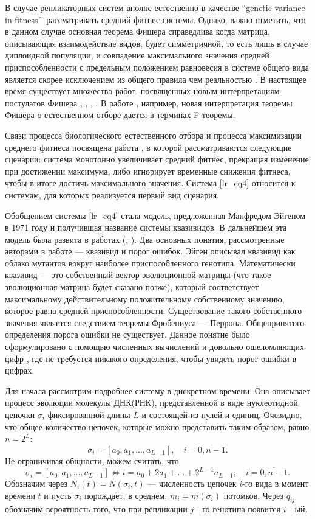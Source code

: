 В случае репликаторных систем вполне естественно в качестве ``genetic variance in fitness''\, рассматривать средний фитнес системы. Однако, важно отметить, что в данном случае основная теорема Фишера справедлива когда матрица, описывающая взаимодействие видов, будет симметричной, то есть лишь в случае диплоидной популяции, и совпадение максимального значения средней приспособленности с предельным положением равновесия в системе общего вида является скорее исключением из общего правила чем реальностью \cite{BratusA}. В настоящее время существует множество работ, посвященных новым интерпретациям постулатов Фишера \cite{ewens}, \cite{lessard}, \cite{ao1}, \cite{ao2}. В работе \cite{ao1}, например, новая интерпретация теоремы Фишера о естественном отборе дается в терминах F-теоремы.

Связи процесса биологического естественного отбора и процесса максимизации среднего фитнеса посвящена работа \cite{Brich}, в которой рассматриваются следующие сценарии: система монотонно увеличивает средний фитнес, прекращая изменение при достижении максимума, либо игнорирует временные снижения фитнеса, чтобы в итоге достичь максимального значения. Система \eqref{lr_eq4} относится к системам, для которых реализуется первый вид сценария.

Обобщением системы \eqref{lr_eq4} стала модель, предложенная Манфредом Эйгеном \cite{Eig1} в 1971 году и получившая название системы квазивидов. В дальнейшем эта модель была развита в работах (\cite{Eig2}, \cite{Eig3}). Два основных понятия, рассмотренные авторами в работе --- квазивид и порог ошибок. Эйген описывал квазивид как облако мутантов вокруг наиболее приспособленного генотипа. Математически квазивид --- это собственный вектор эволюционной матрицы (что такое эволюционная матрица будет сказано позже), который соответствует максимальному действительному положительному собственному значению, которое равно средней приспособленности. Существование такого собственного значения является следствием теоремы Фробениуса --- Перрона. Общепринятого определения порога ошибки не существует. Данное понятие было сформулировано с помощью численных вычислений и довольно ошеломляющих цифр \cite{Shuster1}, где не требуется никакого определения, чтобы увидеть порог ошибки в цифрах.  

Для начала рассмотрим подробнее систему в дискретном времени. Она описывает процесс эволюции молекулы ДНК(РНК), представленной в виде нуклеотидной цепочки $\sigma_{i}$ фиксированной длины $L$ и состоящей из нулей и единиц. Очевидно, что общее количество цепочек, которые можно представить таким образом, равно $n = 2^{L}$: 
$$
\sigma_{i} = [a_{0}, a_{1}, ..., a_{L - 1}], \quad i = \overline{0, n - 1}.
$$
Не ограничивая общности, можем считать, что
$$
\sigma_{i} = [a_{0}, a_{1}, ..., a_{L - 1}] \Leftrightarrow i = a_{0} + 2a_{1} + ... + 2^{L - 1}a_{L - 1}, \quad i = \overline{0, n - 1}.
$$  
Обозначим через $N_{i}(t) = N(\sigma_{i}, t)$ --- численность цепочек $i$-го вида в момент времени $t$ и пусть $\sigma_{i}$ порождает, в среднем, $m_{i} = m(\sigma_{i})$ потомков. Через $q_{ij}$ обозначим вероятность того, что при репликации $j$ - го генотипа появится $i$ - ый.

